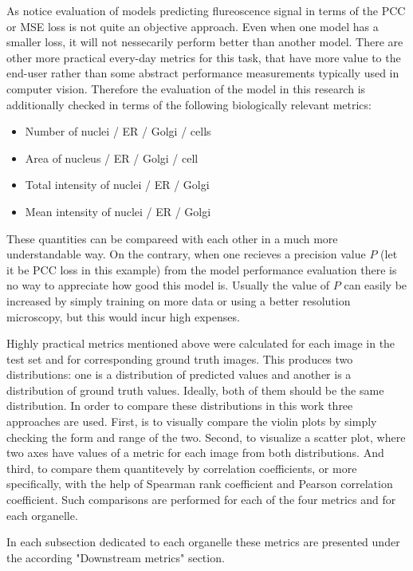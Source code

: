
As \cite{Lachance_2020} notice evaluation of models predicting flureoscence signal in terms of the PCC or MSE loss is not quite an objective approach. Even when one model has a smaller loss, it will not nessecarily perform better than another model. There are other more practical every-day metrics for this task, that have more value to the end-user rather than some abstract performance measurements typically used in computer vision. Therefore the evaluation of the model in this research is additionally checked in terms of the following biologically relevant metrics:
\begin{itemize}
    \item Number of nuclei / ER / Golgi / cells
    \item Area of nucleus / ER / Golgi / cell
    \item Total intensity of nuclei / ER / Golgi
    \item Mean intensity of nuclei / ER / Golgi
\end{itemize}

These quantities can be compareed with each other in a much more understandable way. On the contrary, when one recieves a precision value $P$ (let it be PCC loss in this example) from the model performance evaluation there is no way to appreciate how good this model is. Usually the value of $P$ can easily be increased by simply training on more data or using a better resolution microscopy, but this would incur high expenses.

Highly practical metrics mentioned above were calculated for each image in the test set and for corresponding ground truth images. This produces two distributions: one is a distribution of predicted values and another is a distribution of ground truth values. Ideally, both of them should be the same distribution. In order to compare these distributions in this work three approaches are used. First, is to visually compare the violin plots by simply checking the form and range of the two. Second, to visualize a scatter plot, where two axes have values of a metric for each image from both distributions. And third, to compare them quantitevely by correlation coefficients, or more specifically, with the help of Spearman rank coefficient and Pearson correlation coefficient. Such comparisons are performed for each of the four metrics and for each organelle.

In each subsection dedicated to each organelle these metrics are presented under the according "Downstream metrics" section.